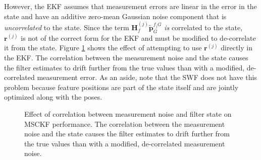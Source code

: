 \documentclass[letterpaper, 10 pt, conference]{ieeeconf}  %
\def\Vec#1{\mathbf{#1}}
\begin{document}
However, the EKF assumes that measurement errors are linear in the error in the state and have an additive zero-mean Gaussian noise component that is \textit{uncorrelated} to the state.
Since the term $\Vec{H}_{f}^{(j)} \widetilde{\Vec{p}}_G^{f_j G}$ \textit{is} correlated to the state, $\Vec{r}^{(j)}$ is not of the correct form for the EKF and must be modified to de-correlate it from the state.
Figure \ref{fig:nullspace} shows the effect of attempting to use $\Vec{r}^{(j)}$ directly in the EKF.
The correlation between the measurement noise and the state causes the filter estimates to drift further from the true values than with a modified, de-correlated measurement error.
As an aside, note that the SWF does not have this problem because feature positions are part of the state itself and are jointly optimized along with the poses.

\begin{figure}
    \centering

    
    \caption{Effect of correlation between measurement noise and filter state on MSCKF performance. The correlation between the measurement noise and the state causes the filter estimates to drift further from the true values than with a modified, de-correlated measurement noise.}
    \label{fig:nullspace}
\end{figure}
\end{document}
